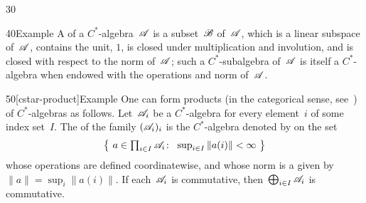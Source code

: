 \begin{parsec}{30}
\begin{point}{40}{Example}%
A %
of a $C^*$-algebra~$\mathscr{A}$
is a subset~$\mathscr{B}$ of~$\mathscr{A}$,
which is a linear subspace of~$\mathscr{A}$,
contains the unit, $1$, is closed under multiplication
and involution, 
and is closed with respect to the norm of~$\mathscr{A}$;
such a $C^*$-subalgebra of~$\mathscr{A}$
is itself a $C^*$-algebra
when endowed with the operations and norm
of~$\mathscr{A}$.
\end{point}
\begin{point}{50}[cstar-product]{Example}%
One can form products (in the categorical sense,
see~) of $C^*$-algebras as follows.
Let~$\mathscr{A}_i$ be a $C^*$-algebra
for every element~$i$ of some index set~$I$.
The %
of the family $(\mathscr{A}_i)_i$
is the $C^*$-algebra
denoted by  on the set
\begin{equation*}
\textstyle
\bigl\{\ 
a\in \prod_{i\in I}\scrA_i\colon\  \sup_{i \in I} \|a(i)\|< \infty \ 
\bigr\}
\end{equation*}
whose operations are defined coordinatewise,
and whose norm is a %
\index{supremum norm}%
given by $\|a\|=\sup_{i}\|a(i)\|$.
If each~$\mathscr{A}_i$ is commutative,
then~$\bigoplus_{i\in I}\mathscr{A}_i$
is commutative.


\end{point}
\end{parsec}
